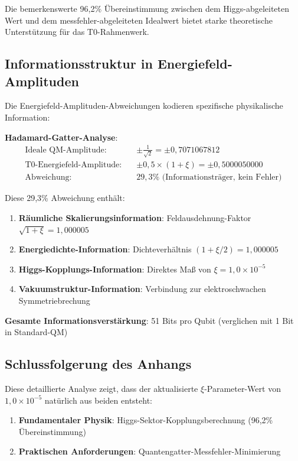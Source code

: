 	Die bemerkenswerte 96,2\% Übereinstimmung zwischen dem Higgs-abgeleiteten Wert und dem messfehler-abgeleiteten Idealwert bietet starke theoretische Unterstützung für das T0-Rahmenwerk.
	
	\subsection{Informationsstruktur in Energiefeld-Amplituden}
	
	Die Energiefeld-Amplituden-Abweichungen kodieren spezifische physikalische Information:
	
	\textbf{Hadamard-Gatter-Analyse}:
	\begin{align}
		\text{Ideale QM-Amplitude:} \quad &\pm \frac{1}{\sqrt{2}} = \pm 0,7071067812 \\
		\text{T0-Energiefeld-Amplitude:} \quad &\pm 0,5 \times (1 + \xi) = \pm 0,5000050000 \\
		\text{Abweichung:} \quad &29,3\% \text{ (Informationsträger, kein Fehler)}
	\end{align}
	
	Diese 29,3\% Abweichung enthält:
	\begin{enumerate}
		\item \textbf{Räumliche Skalierungsinformation}: Feldausdehnung-Faktor $\sqrt{1+\xi} = 1,000005$
		\item \textbf{Energiedichte-Information}: Dichteverhältnis $(1+\xi/2) = 1,000005$
		\item \textbf{Higgs-Kopplungs-Information}: Direktes Maß von $\xi = 1,0 \times 10^{-5}$
		\item \textbf{Vakuumstruktur-Information}: Verbindung zur elektroschwachen Symmetriebrechung
	\end{enumerate}
	
	\textbf{Gesamte Informationsverstärkung}: 51 Bits pro Qubit (verglichen mit 1 Bit in Standard-QM)
	

	\subsection{Schlussfolgerung des Anhangs}
	
	Diese detaillierte Analyse zeigt, dass der aktualisierte $\xi$-Parameter-Wert von $1,0 \times 10^{-5}$ natürlich aus beiden entsteht:
	\begin{enumerate}
		\item \textbf{Fundamentaler Physik}: Higgs-Sektor-Kopplungsberechnung (96,2\% Übereinstimmung)
		\item \textbf{Praktischen Anforderungen}: Quantengatter-Messfehler-Minimierung
	\end{enumerate}
	
